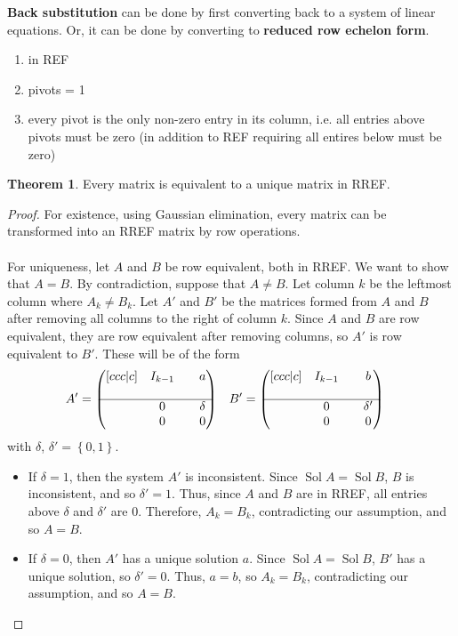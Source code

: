 \documentclass[letterpaper,12pt]{article}
\theoremstyle{definition}
\newtheorem*{theorem}{Theorem}
\newcommand{\set}[1]{\left\{ #1 \right\}}
\DeclareMathOperator{\sol}{Sol}
\begin{document}
\textbf{Back substitution} can be done by first converting back to a system of linear equations. Or, it can be done by converting to \textbf{reduced row echelon form}.
\begin{enumerate}
    \item in REF
    \item pivots = 1
    \item every pivot is the only non-zero entry in its column, i.e. all entries above pivots must be zero (in addition to REF requiring all entires below must be zero)
\end{enumerate}
\begin{theorem}
Every matrix is equivalent to a unique matrix in RREF.
\end{theorem}
\begin{proof}
For existence, using Gaussian elimination, every matrix can be transformed into an RREF matrix by row operations.
\\ \\ For uniqueness, let $A$ and $B$ be row equivalent, both in RREF. We want to show that $A = B$. By contradiction, suppose that $A \neq B$. Let column $k$ be the leftmost column where $A_k \neq B_k$. Let $A'$ and $B'$ be the matrices formed from $A$ and $B$ after removing all columns to the right of column $k$. Since $A$ and $B$ are row equivalent, they are row equivalent after removing columns, so $A'$ is row equivalent to $B'$. These will be of the form
\begin{align*}
    A' & = \begin{pmatrix}[ccc|c] & I_{k-1} & & a \\ & & & \\ \hline & 0 & & \delta \\ & 0 & & 0 \end{pmatrix}
    && B' = \begin{pmatrix}[ccc|c] & I_{k-1} & & b \\ & & & \\ \hline & 0 & & \delta' \\ & 0 & & 0 \end{pmatrix}
\end{align*}
with $\delta$, $\delta' = \set{0,1}$.
\begin{itemize}
    \item If $\delta = 1$, then the system $A'$ is inconsistent. Since $\sol{A} = \sol{B}$, $B$ is inconsistent, and so $\delta' = 1$. Thus, since $A$ and $B$ are in RREF, all entries above $\delta$ and $\delta'$ are $0$. Therefore, $A_k = B_k$, contradicting our assumption, and so $A = B$.
    \item If $\delta = 0$, then $A'$ has a unique solution $a$. Since $\sol{A} = \sol{B}$, $B'$ has a unique solution, so $\delta' = 0$. Thus, $a = b$, so $A_k = B_k$, contradicting our assumption, and so $A = B$.
\end{itemize}
\end{proof}
\end{document}
